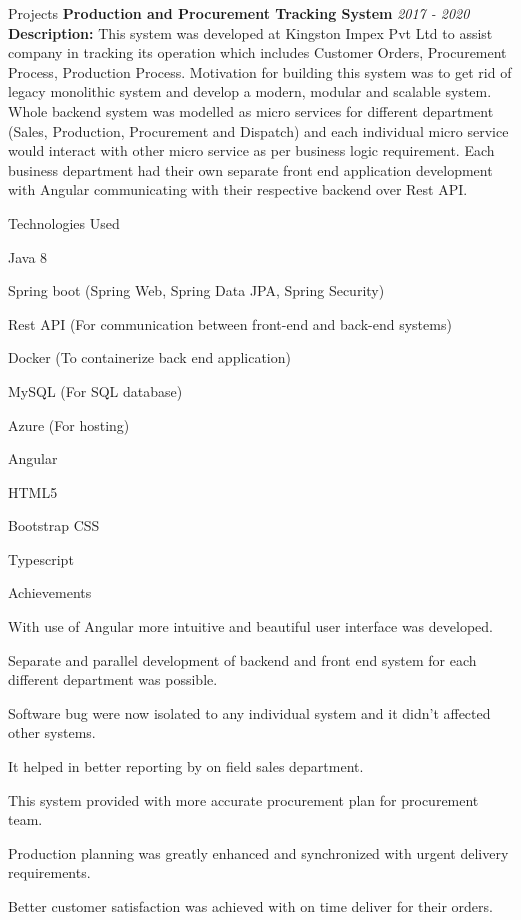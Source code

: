\documentclass{resume}
\begin{document}
\begin{rSection}{Projects}
{\bf Production and Procurement Tracking System} \hfill {\em  2017 - 2020} 
\\{\bf Description:} This system was developed at Kingston Impex Pvt Ltd to assist company in tracking its operation which includes Customer Orders, Procurement Process, Production Process. Motivation for building this system was to get rid of legacy monolithic system and develop a modern, modular and scalable system. Whole backend system was modelled as micro services for different department (Sales, Production, Procurement and Dispatch) and each individual micro service would interact with other micro service as per business logic requirement. Each business department had their own separate  front end application development with Angular communicating with their respective backend over Rest API.

\begin{rSubsection}{Technologies Used}{}{}{}
\item Java 8
\item Spring boot (Spring Web, Spring Data JPA, Spring Security)
\item Rest API (For communication between front-end and back-end systems)
\item Docker (To containerize back end application)
\item MySQL (For SQL database)
\item Azure (For hosting)


\item Angular
\item HTML5
\item Bootstrap CSS
\item Typescript
\end{rSubsection}

\begin{rSubsection}{Achievements}{}{}{}
\item With use of Angular more intuitive and beautiful user interface was developed.
\item Separate and parallel development of backend and front end system for each different department was possible.
\item Software bug were now isolated to any individual system and it didn't affected other systems.
\item It helped in better reporting by on field sales department.
\item This system provided with more accurate procurement plan for procurement team.
\item Production planning was greatly enhanced and synchronized with urgent delivery requirements.
\item Better customer satisfaction was achieved with on time deliver for their orders.
\end{rSubsection}


\end{rSection}
\end{document}
